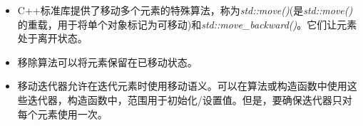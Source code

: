 \begin{itemize}
	\item C++标准库提供了移动多个元素的特殊算法，称为\textit{std::move()}(是\textit{std::move()}的重载，用于将单个对象标记为可移动)和\textit{std::move\_backward()}。它们让元素处于离开状态。
	\item 移除算法可以将元素保留在已移动状态。
	\item 移动迭代器允许在迭代元素时使用移动语义。可以在算法或构造函数中使用这些迭代器，构造函数中，范围用于初始化/设置值。但是，要确保迭代器只对每个元素使用一次。
\end{itemize}


\newpage